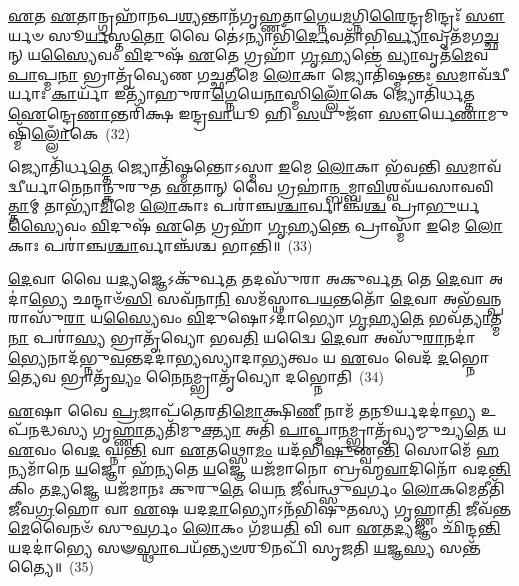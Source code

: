 \-\ul{𑌏}\-𑌤 \ul{𑌏}\-𑌤𑌾𑌨𑍍𑌗𑍍𑌰𑌹𑌾᳴𑌨𑌪\-\ul{𑌶𑍍𑌯}\-𑌨𑍍𑌤𑌾𑌨᳴𑌗𑍃𑌹𑍍𑌣𑌤𑌾\-\ul{𑌗𑍍𑌨𑍇}\-𑌯\-\ul{𑌮}\-𑌗𑍍𑌨𑌿\-\ul{𑌰𑍈}\-𑌨𑍍𑌦𑍍𑌰𑌮𑌿𑌨𑍍𑌦𑍍𑌰𑌃᳴ \ul{𑌸𑍗}\-𑌰𑍍𑌯𑍞 𑌸𑍂\-\ul{𑌰𑍍𑌯}\-𑌸𑍍𑌤\-\ul{𑌤𑍋} 𑌵𑍈 𑌤𑍇॑\-𑌽𑌨𑍍𑌯𑌾𑌭𑌿᳴\-\ul{𑌰𑍍𑌦𑍇}\-𑌵𑌤𑌾᳴𑌭𑌿\-\ul{𑌰𑍍𑌵𑍍𑌯𑌾}\-𑌵𑍃𑌤᳴𑌮𑌗\-\ul{𑌚𑍍𑌛}\-𑌨𑍍 𑌯\-\ul{𑌸𑍍𑌯𑍈}\-𑌵𑌂 \ul{𑌵𑌿}\-𑌦𑍁𑌷᳴ \ul{𑌏}\-𑌤𑍇 𑌗𑍍𑌰𑌹𑌾᳴ \ul{𑌗𑍃}\-𑌹𑍍𑌯𑌨𑍍𑌤𑍇॑ \ul{𑌵𑍍𑌯𑌾}\-𑌵𑍃𑌤᳴\-\ul{𑌮𑍇}\-𑌵 \ul{𑌪𑌾}\-𑌪𑍍𑌮\-\ul{𑌨𑌾} 𑌭𑍍𑌰𑌾𑌤𑍃᳴𑌵𑍍𑌯𑍇𑌣 𑌗𑌚𑍍𑌛\-\ul{𑌤𑍀}\-𑌮𑍇 \ul{𑌲𑍋}\-𑌕𑌾 𑌜𑍍𑌯𑍋𑌤𑌿᳴𑌷𑍍𑌮𑌨𑍍𑌤𑌃 \ul{𑌸}\-𑌮𑌾𑌵᳴𑌦𑍍𑌵𑍀𑌰𑍍𑌯𑌾𑌃 \ul{𑌕𑌾}\-𑌰𑍍𑌯𑌾᳴ 𑌇𑌤𑍍𑌯𑌾᳴𑌹𑍁𑌰𑌾\-\ul{𑌗𑍍𑌨𑍇}\-𑌯𑍇\-\ul{𑌨𑌾}\-𑌸𑍍𑌮𑌿\-\ul{𑌲𑍍𑌲𑍋𑌁}\-𑌕𑍇 𑌜𑍍𑌯𑍋𑌤𑌿᳴𑌰𑍍𑌧𑌤𑍍𑌤 \ul{𑌐}\-𑌨𑍍𑌦𑍍𑌰𑍇\-\ul{𑌣𑌾}\-𑌨𑍍𑌤𑌰𑌿᳴𑌕𑍍𑌷 𑌇𑌨𑍍𑌦𑍍𑌰\-\ul{𑌵𑌾}\-𑌯𑍂 𑌹𑌿 \ul{𑌸}\-𑌯𑍁𑌜𑍗᳴ \ul{𑌸𑍗}\-𑌰𑍍𑌯𑍇\-\ul{𑌣𑌾}\-𑌮𑍁𑌷𑍍𑌮𑌿᳴\-\ul{𑌲𑍍𑌲𑍋𑌁}\-𑌕𑍇~(32)

𑌜𑍍𑌯𑍋𑌤𑌿᳴𑌰𑍍𑌧\-\ul{𑌤𑍍𑌤𑍇} 𑌜𑍍𑌯𑍋𑌤𑌿᳴𑌷𑍍𑌮𑌨𑍍𑌤𑍋\-𑌽𑌸𑍍𑌮𑌾 \ul{𑌇}\-𑌮𑍇 \ul{𑌲𑍋}\-𑌕𑌾 𑌭᳴𑌵𑌨𑍍𑌤𑌿 \ul{𑌸}\-𑌮𑌾𑌵᳴𑌦𑍍𑌵𑍀𑌰𑍍𑌯𑌾𑌨𑍇𑌨𑌾𑌨𑍍𑌕𑍁𑌰𑍁𑌤 \ul{𑌏}\-𑌤𑌾𑌨𑍍 𑌵𑍈 𑌗𑍍𑌰𑌹𑌾॑\-\ul{𑌨𑍍𑌬}\-𑌮𑍍𑌬𑌾\-\ul{𑌵𑌿}\-𑌶𑍍𑌵𑌵᳴𑌯𑌸𑌾𑌵𑌵𑌿\-\ul{𑌤𑍍𑌤𑌾}\-𑌮𑍍 𑌤𑌾𑌭𑍍𑌯𑌾᳴\-\ul{𑌮𑌿}\-𑌮𑍇 \ul{𑌲𑍋}\-𑌕𑌾𑌃 𑌪𑌰𑌾॑𑌞𑍍𑌚\-\ul{𑌶𑍍𑌚𑌾}\-𑌰𑍍𑌵𑌾𑌞𑍍𑌚᳴\-\ul{𑌶𑍍𑌚} 𑌪𑍍𑌰𑌾\-\ul{𑌭𑍁}\-𑌰𑍍𑌯\-\ul{𑌸𑍍𑌯𑍈}\-𑌵𑌂 \ul{𑌵𑌿}\-𑌦𑍁𑌷᳴ \ul{𑌏}\-𑌤𑍇 𑌗𑍍𑌰𑌹𑌾᳴ \ul{𑌗𑍃}\-𑌹𑍍𑌯\-\ul{𑌨𑍍𑌤𑍇} 𑌪𑍍𑌰𑌾𑌸𑍍𑌮𑌾᳴ \ul{𑌇}\-𑌮𑍇 \ul{𑌲𑍋}\-𑌕𑌾𑌃 𑌪𑌰𑌾॑𑌞𑍍𑌚\-\ul{𑌶𑍍𑌚𑌾}\-𑌰𑍍𑌵𑌾𑌞𑍍𑌚᳴𑌶𑍍𑌚 𑌭𑌾𑌨𑍍𑌤𑌿॥~(33)

{\anuvakamend[{\-\ul{𑌉}\-𑌕𑍍𑌥𑍍𑌯𑍇᳴ \ul{𑌦𑍇}\-𑌵𑌾 \ul{𑌅}\-𑌮𑍁𑌷𑍍𑌮𑌿᳴\-\ul{𑌲𑍍𑌲𑍋𑌁}\-𑌕 𑌏\-\ul{𑌕𑌾}\-𑌨𑍍𑌨𑌚᳴𑌤𑍍𑌵𑌾\-\ul{𑌰𑌿}\-\-\ul{𑍞}\-𑌶𑌚𑍍𑌚᳴}]}%

\-\ul{𑌦𑍇}\-𑌵𑌾 𑌵𑍈 𑌯\-\ul{𑌦𑍍𑌯}\-𑌜𑍍𑌞𑍇\-𑌽𑌕𑍁᳴𑌰𑍍𑌵\-\ul{𑌤} 𑌤𑌦𑌸𑍁᳴𑌰𑌾 𑌅𑌕𑍁𑌰𑍍𑌵\-\ul{𑌤} 𑌤𑍇 \ul{𑌦𑍇}\-𑌵𑌾 𑌅𑌦𑌾॑\-\ul{𑌭𑍍𑌯𑍇} 𑌛𑌨𑍍𑌦𑌾𑍞᳴\-\ul{𑌸𑌿} 𑌸𑌵᳴𑌨𑌾\-\ul{𑌨𑌿} 𑌸𑌮᳴𑌸𑍍𑌥𑌾𑌪\-\ul{𑌯}\-𑌨𑍍𑌤𑌤𑍋᳴ \ul{𑌦𑍇}\-𑌵𑌾 𑌅𑌭᳴\-\ul{𑌵}\-𑌨𑍍𑌪𑌰𑌾𑌸𑍁᳴\-\ul{𑌰𑌾} 𑌯\-\ul{𑌸𑍍𑌯𑍈}\-𑌵𑌂 \ul{𑌵𑌿}\-𑌦𑍁𑌷𑍋\-𑌽𑌦𑌾॑𑌭𑍍𑌯𑍋 \ul{𑌗𑍃}\-𑌹𑍍𑌯\-\ul{𑌤𑍇} 𑌭𑌵᳴\-\ul{𑌤𑍍𑌯𑌾}\-𑌤𑍍𑌮\-\ul{𑌨𑌾} 𑌪𑌰𑌾॑\-\ul{𑌸𑍍𑌯} 𑌭𑍍𑌰𑌾𑌤𑍃᳴𑌵𑍍𑌯𑍋 𑌭𑌵\-\ul{𑌤𑌿} 𑌯𑌦𑍍𑌵𑍈 \ul{𑌦𑍇}\-𑌵𑌾 𑌅𑌸𑍁᳴\-\ul{𑌰𑌾}\-𑌨𑌦𑌾॑\-\ul{𑌭𑍍𑌯𑍇}\-𑌨𑌾\-𑌦᳴𑌭𑍍𑌨𑍁\-\ul{𑌵}\-𑌨𑍍𑌤𑌦𑌦𑌾॑𑌭𑍍𑌯𑌸𑍍𑌯𑌾𑌦𑌾\-\ul{𑌭𑍍𑌯}\-𑌤𑍍𑌵𑌂 𑌯 \ul{𑌏}\-𑌵𑌂 𑌵𑍇𑌦᳴ \ul{𑌦}\-𑌭𑍍𑌨𑍋\-\ul{𑌤𑍍𑌯𑍇}\-𑌵 𑌭𑍍𑌰𑌾𑌤𑍃᳴\-\ul{𑌵𑍍𑌯𑌂} 𑌨𑍈\-\ul{𑌨}\-𑌮𑍍𑌭𑍍𑌰𑌾𑌤𑍃᳴𑌵𑍍𑌯𑍋 𑌦𑌭𑍍𑌨𑍋𑌤𑌿~(34)

\-\ul{𑌏}\-𑌷𑌾 𑌵𑍈 \ul{𑌪𑍍𑌰}\-𑌜𑌾𑌪᳴𑌤𑍇𑌰𑌤𑌿\-\ul{𑌮𑍋}\-𑌕𑍍𑌷𑌿\-\ul{𑌣𑍀} 𑌨𑌾𑌮᳴ \ul{𑌤}\-𑌨𑍂𑌰𑍍𑌯𑌦𑌦𑌾॑\-\ul{𑌭𑍍𑌯} 𑌉𑌪᳴𑌨𑌦𑍍𑌧𑌸𑍍𑌯 𑌗𑍃\-\ul{𑌹𑍍𑌣𑌾}\-𑌤𑍍𑌯𑌤𑌿᳴𑌮𑍁\-\ul{𑌕𑍍𑌤𑍍𑌯𑌾} 𑌅𑌤𑌿᳴ \ul{𑌪𑌾}\-𑌪𑍍𑌮𑌾\-\ul{𑌨}\-𑌮𑍍𑌭𑍍𑌰𑌾𑌤𑍃᳴𑌵𑍍𑌯𑌮𑍍𑌮𑍁𑌚𑍍𑌯\-\ul{𑌤𑍇} 𑌯 \ul{𑌏}\-𑌵𑌂 𑌵𑍇\-\ul{𑌦} 𑌘𑍍𑌨\-\ul{𑌨𑍍𑌤𑌿} 𑌵𑌾 \ul{𑌏}\-𑌤𑌥𑍍𑌸𑍋\-\ul{𑌮𑌂} 𑌯𑌦᳴𑌭𑌿\-\ul{𑌷𑍁}\-𑌣𑍍𑌵\-\ul{𑌨𑍍𑌤𑌿} 𑌸𑍋𑌮𑍇᳴ \ul{𑌹}\-𑌨𑍍𑌯𑌮𑌾᳴𑌨𑍇 \ul{𑌯}\-𑌜𑍍𑌞𑍋 𑌹᳴𑌨𑍍𑌯𑌤𑍇 \ul{𑌯}\-𑌜𑍍𑌞𑍇 𑌯𑌜᳴𑌮𑌾𑌨𑍋 𑌬𑍍𑌰𑌹𑍍𑌮\-\ul{𑌵𑌾}\-𑌦𑌿𑌨𑍋᳴ 𑌵𑌦\-\ul{𑌨𑍍𑌤𑌿} 𑌕𑌿𑌂 𑌤\-\ul{𑌦𑍍𑌯}\-𑌜𑍍𑌞𑍇 𑌯𑌜᳴𑌮𑌾𑌨𑌃 𑌕𑍁𑌰𑍁\-\ul{𑌤𑍇} 𑌯𑍇\-\ul{𑌨} 𑌜𑍀𑌵॑𑌨𑍍𑌥𑍍𑌸𑍁\-\ul{𑌵}\-𑌰𑍍𑌗𑌂 \ul{𑌲𑍋}\-𑌕𑌮𑍇𑌤𑍀𑌤𑌿᳴ 𑌜𑍀𑌵\-\ul{𑌗𑍍𑌰}\-𑌹𑍋 𑌵𑌾 \ul{𑌏}\-𑌷 𑌯𑌦\-\ul{𑌦𑌾}\-𑌭𑍍𑌯𑍋\-𑌽𑌨᳴𑌭𑌿𑌷𑍁𑌤𑌸𑍍𑌯 𑌗𑍃𑌹𑍍𑌣𑌾\-\ul{𑌤𑌿} 𑌜𑍀𑌵᳴𑌨𑍍𑌤\-\ul{𑌮𑍇}\-𑌵𑍈𑌨𑍞᳴ 𑌸𑍁\-\ul{𑌵}\-𑌰𑍍𑌗𑌂 \ul{𑌲𑍋}\-𑌕𑌂 𑌗᳴𑌮𑌯\-\ul{𑌤𑌿} 𑌵𑌿 𑌵𑌾 \ul{𑌏}\-𑌤\-\ul{𑌦𑍍𑌯}\-𑌜𑍍𑌞𑌂 𑌛𑌿᳴𑌨𑍍𑌦\-\ul{𑌨𑍍𑌤𑌿} 𑌯𑌦𑌦𑌾॑𑌭𑍍𑌯𑍇 𑌸𑍟\-\ul{𑌸𑍍𑌥𑌾}\-𑌪𑌯᳴\-\ul{𑌨𑍍𑌤𑍍𑌯}\-\-\ul{𑍞}\-𑌶𑍂𑌨𑌪𑌿᳴ 𑌸𑍃𑌜𑌤𑌿 \ul{𑌯}\-𑌜𑍍𑌞\-\ul{𑌸𑍍𑌯} 𑌸𑌨𑍍𑌤᳴𑌤𑍍𑌯𑍈॥~(35)

